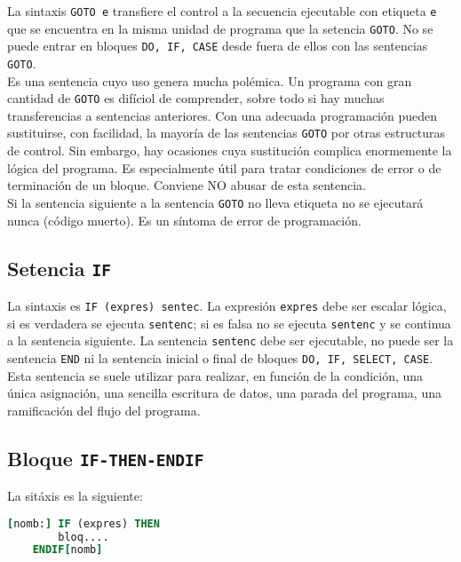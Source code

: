 La sintaxis {\tt GOTO e} transfiere el control a la secuencia ejecutable con etiqueta {\tt e} que se encuentra en la misma unidad de programa que la setencia {\tt GOTO}. No se puede entrar en bloques {\tt DO, IF, CASE} desde fuera de ellos con las sentencias {\tt GOTO}. \\

Es una sentencia cuyo uso genera mucha polémica. Un programa con gran cantidad de {\tt GOTO} es difíciol de comprender, sobre todo si hay muchas transferencias a sentencias anteriores. Con una adecuada programación pueden sustituirse, con facilidad, la mayoría de las sentencias {\tt GOTO} por otras estructuras de control. Sin embargo, hay ocasiones cuya sustitución complica enormemente la lógica del programa. Es especialmente útil para tratar condiciones de error o de terminación de un bloque. Conviene NO abusar de esta sentencia. \\

Si la sentencia siguiente a la sentencia {\tt GOTO} no lleva etiqueta no se ejecutará nunca (código muerto). Es un síntoma de error de programación.

\subsection{Setencia {\tt IF}}

La sintaxis es {\tt IF (expres) sentec}. La expresión {\tt expres} debe ser escalar lógica, si es verdadera se ejecuta {\tt sentenc}; si es falsa no se ejecuta {\tt sentenc} y se continua a la sentencia siguiente. La sentencia {\tt sentenc} debe ser ejecutable, no puede ser la sentencia {\tt END} ni la sentencia inicial o final de bloques {\tt DO, IF, SELECT, CASE}. \\

Esta sentencia se suele utilizar para realizar, en función de la condición, una única asignación, una sencilla escritura de datos, una parada del programa, una ramificación del flujo del programa.

\subsection{Bloque {\tt IF-THEN-ENDIF}}

La sitáxis es la siguiente:

\begin{lstlisting}[language=Fortran]
	[nomb:] IF (expres) THEN 
		bloq....
	ENDIF[nomb]
\end{lstlisting}

